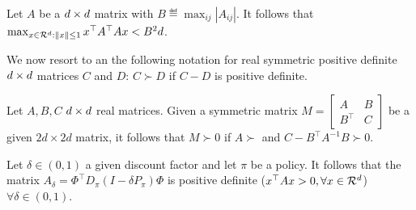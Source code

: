 \begin{lemma}\label{lm:matnorm}
Let $A$ be a $d \times d$ matrix with $B\eqdef\max_{ij}\left|A_{ij}\right|$. It follows that $\max_{x\in \mathcal{R}^d: \left\| x\right\|\leq1}x^\top A^\top A x <B^2d$.
\end{lemma}

We now resort to an the following notation for real symmetric positive definite $d \times d$ matrices $C$ and $D$: $C\succ D$ if $C-D$ is positive definite.
\begin{lemma}\label{lm:schur}
Let $A,B,C$ $d \times d$ real matrices. Given a symmetric matrix $M=\left[\begin{matrix}A&B \\B^\top &C\end{matrix}\right]$ be a given $2d\times 2d$ matrix, it follows that $M\succ 0$ if	$A\succ$ and $C-B^\top A^{-1}B\succ 0$.
\end{lemma}

\begin{lemma}\label{lm:amat}
Let $\delta\in(0,1)$ a given discount factor and let $\pi$ be a policy. It follows that the matrix $A_\delta=\Phi^\top D_\pi(I-\delta P_\pi)\Phi$ is positive definite ($x^\top Ax>0,\forall x \in \mathcal{R}^d$) $\forall \delta\in(0,1)$.
\end{lemma}


